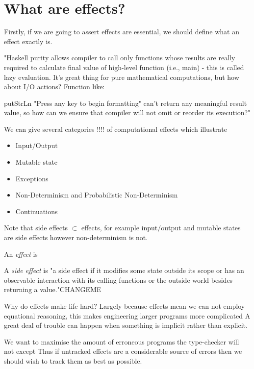 \section{What are effects?}
Firstly, if we are going to assert effects are essential,
we should define what an effect exactly is.

"Haskell purity allows compiler to call only functions whose results are really required to calculate final value of high-level function (i.e., main) - this is called lazy evaluation. It's great thing for pure mathematical computations, but how about I/O actions? Function like:

putStrLn "Press any key to begin formatting"
can't return any meaningful result value, so how can we ensure that compiler will not omit or reorder its execution?"

\begin{example}
    We can give several categories !!!! of computational effects
    which illustrate
    \begin{itemize}
        \item Input/Output
        \item Mutable state
        \item Exceptions
        \item Non-Determinism and Probabilistic Non-Determinism
        \item Continuations
    \end{itemize}
\end{example}

Note that side effects $\subset$ effects,
for example input/output and mutable states are side effects
however non-determinism is not.
\begin{definition}
    An \textit{effect} is
\end{definition}

\begin{definition}
    A \textit{side effect} is
"a side effect if it modifies some state outside its scope or has an observable interaction with its calling functions or the outside world besides returning a value."CHANGEME
\cite{hughes1989functional}
\end{definition}

Why do effects make life hard?
Largely because effects mean we can not employ equational reasoning,
this makes engineering larger programs more complicated
A great deal of trouble can happen when something is implicit
rather than explicit.

We want to maximise the amount of erroneous programs the type-checker will not except
Thus if untracked effects are a considerable source of errors then we should
wish to track them as best as possible.

